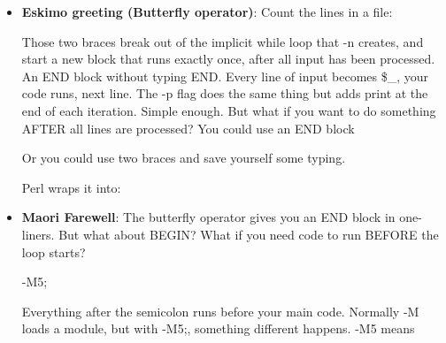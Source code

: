 \documentclass{report}
\begin{document}
\begin{itemize}
        
        \item \textbf{Eskimo greeting (Butterfly operator)}: Count the lines in a file:
            \bigbreak \noindent 
            \begin{perlcode}
                perl -lne '}{ print $.'
            \end{perlcode}
            \bigbreak \noindent 
            Those two braces break out of the implicit while loop that -n creates, and start a new block that runs exactly once, after all input has been processed. An END block without typing END.
            \bigbreak \noindent 
            Every line of input becomes \$\_, your code runs, next line. The -p flag does the same thing but adds print at the end of each iteration.
            \bigbreak \noindent 
            Simple enough. But what if you want to do something AFTER all lines are processed? You could use an END block
            \bigbreak \noindent 
            \bigbreak \noindent 
            Or you could use two braces and save yourself some typing.
            \bigbreak \noindent 
            \begin{perlcode}
                perl -ne '$sum += $_; }{ print $sum' numbers.txt
            \end{perlcode}
            \bigbreak \noindent 
            Perl wraps it into:
            \bigbreak \noindent 
        \item \textbf{Maori Farewell}: The butterfly operator gives you an END block in one-liners. But what about BEGIN? What if you need code to run BEFORE the loop starts?
            \bigbreak \noindent 
            \begin{perlcode}
            -M5;
            \end{perlcode}
            \bigbreak \noindent 
            Everything after the semicolon runs before your main code. Normally -M loads a module, but with -M5;, something different happens.
            \bigbreak \noindent 
            -M5 means
            \bigbreak \noindent 
            \begin{perlcode}

\end{perlcode}
\end{itemize}
\end{document}
